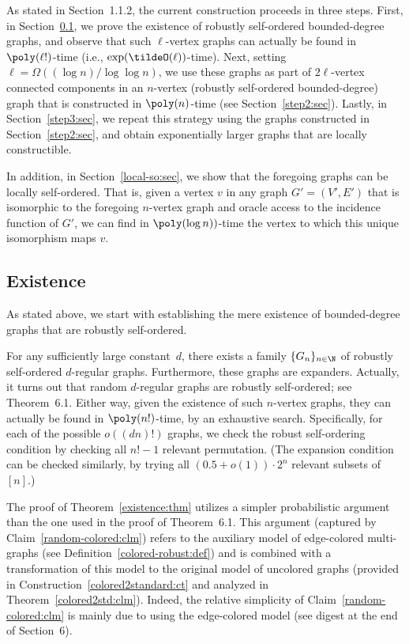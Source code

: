 As stated in Section~1.1.2,
the current construction proceeds in three steps.
First, in Section~\ref{step1:sec}, we prove the existence
of robustly self-ordered bounded-degree graphs,
and observe that such $\ell$-vertex graphs can actually
be found in $\poly(\ell!)$-time (i.e., $\exp(\tildeO(\ell))$-time).
Next, setting $\ell=\Omega((\log n)/\log\log n)$,
we use these graphs as part of $2\ell$-vertex
connected components in an $n$-vertex
(robustly self-ordered bounded-degree)
graph that is constructed in $\poly(n)$-time
(see Section~\ref{step2:sec}).
Lastly, in Section~\ref{step3:sec},
we repeat this strategy using the graphs
constructed in Section~\ref{step2:sec},
and obtain exponentially larger graphs
that are locally constructible.

%
%
In addition, in Section~\ref{local-so:sec},
we show that the foregoing graphs can be locally self-ordered.
That is, given a vertex $v$ in any graph $G'=(V',E')$
that is isomorphic to the foregoing $n$-vertex graph
and oracle access to the incidence function of $G'$,
we can find in $\poly(\log n))$-time the vertex
to which this unique isomorphism maps $v$.
%

%
%
%
%
%
%
%

\subsection{Existence}
\label{step1:sec}
As stated above, we start with establishing the mere existence
of bounded-degree graphs that are robustly self-ordered.

\label{existence:thm}
For any sufficiently large constant~$d$,
there exists a family $\{G_n\}_{n\in\N}$
of robustly self-ordered $d$-regular graphs.
Furthermore, these graphs are expanders.
\ET
Actually, it turns out that random $d$-regular graphs
are robustly self-ordered; see Theorem~6.1.
Either way, given the existence of such $n$-vertex graphs,
they can actually be found in $\poly(n!)$-time,
by an exhaustive search. Specifically,
for each of the possible $o((dn)!)$ graphs,
we check the robust self-ordering condition
by checking all $n!-1$ relevant permutation.
(The expansion condition can be checked similarly,
by trying all $(0.5+o(1))\cdot2^n$ relevant subsets of~$[n]$.)

The proof of Theorem~\ref{existence:thm} utilizes
a simpler probabilistic argument than the one used
in the proof of Theorem~6.1.
This argument (captured by Claim~\ref{random-colored:clm})
refers to the auxiliary model of edge-colored multi-graphs
(see Definition~\ref{colored-robust:def})
and is combined with a transformation of
this model to the original model of uncolored graphs
(provided in Construction~\ref{colored2standard:ct}
and analyzed in Theorem~\ref{colored2std:clm}).
Indeed, the relative simplicity of Claim~\ref{random-colored:clm}
is mainly due to using the edge-colored model
(see digest at the end of Section~6).
\medskip

